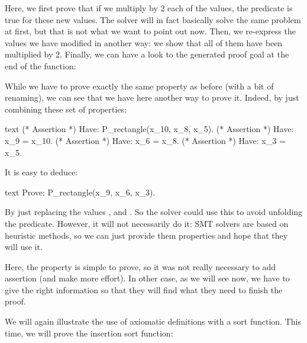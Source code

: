 


Here, we first prove that if we multiply by 2 each of the values, the predicate
is true for these new values. The solver will in fact basically solve the same
problem at first, but that is not what we want to point out now. Then, we
re-express the values we have modified in another way: we show that all of them
have been multiplied by 2. Finally, we can have a look to the generated proof
goal at the end of the function:






While we have to prove exactly the same property as before (with a bit of
renaming), we can see that we have here another way to prove it. Indeed, by
just combining these set of properties:


\begin{CodeBlock}{text}
(* Assertion *)
Have: P_rectangle(x_10, x_8, x_5).
(* Assertion *)
Have: x_9 = x_10.
(* Assertion *)
Have: x_6 = x_8.
(* Assertion *)
Have: x_3 = x_5.
\end{CodeBlock}


It is easy to deduce:


\begin{CodeBlock}{text}
Prove: P_rectangle(x_9, x_6, x_3).
\end{CodeBlock}


By just replacing the values ,  and
. So the solver could use this to avoid unfolding the
predicate. However, it will not necessarily do it: SMT solvers are based on
heuristic methods, so we can just provide them properties and hope that they
will use it.



Here, the property is simple to prove, so it was not really necessary to add
assertion (and make more effort). In other case, as we will see now, we have to
give the right information so that they will find what they need to finish the
proof.












We will again illustrate the use of axiomatic definitions with a sort
function. This time, we will prove the insertion sort function:



